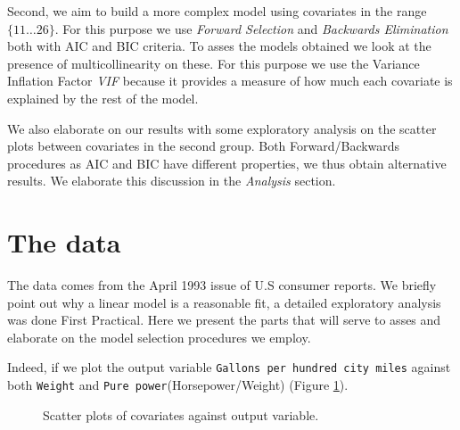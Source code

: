 \documentclass[12pt]{article}
\begin{document}
Second, we aim to build a more complex model using covariates in the range $\{11 \ldots 26\}$.
For this purpose we use \emph{Forward Selection} and \emph{Backwards Elimination} both
with AIC and BIC criteria. To asses the models obtained we look at the presence of multicollinearity on these. For this purpose we use the Variance Inflation Factor \emph{VIF}
because it provides a measure of how much each covariate is explained by the rest of the model.

We also elaborate on our results with some exploratory analysis on the
scatter plots between covariates in the second group. Both Forward/Backwards procedures as AIC and BIC have different properties, we thus
obtain alternative results. We elaborate this discussion in the \emph{Analysis} section.

\section{The data} \label{sec:thedata}
The data comes from the April 1993 issue of U.S consumer reports.
We briefly point out why a linear model is a reasonable fit, a detailed
exploratory analysis was done First Practical. Here we present the parts
that will serve to asses and elaborate on the model selection procedures we employ.

Indeed, if we plot the output variable \texttt{Gallons per hundred city miles} against both \texttt{Weight} and \texttt{Pure power}(Horsepower/Weight) (Figure \ref{fig:scatter}).

\begin{figure}[h]
\centering
{}
\caption{Scatter plots of covariates against output variable.}
\label{fig:scatter}
\end{figure}
\end{document}
